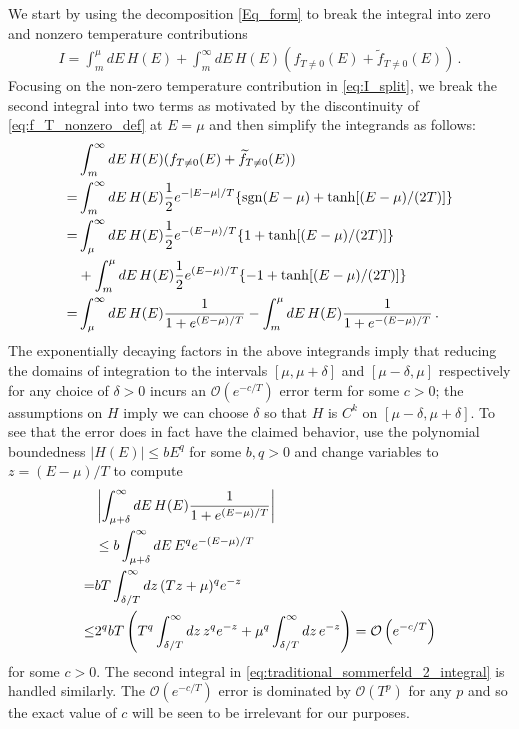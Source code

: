 \documentclass[sn-mathphys,Numbered]{sn-jnl}
\begin{document}
We start by using the decomposition \eqref{Eq_form}  to break the integral into zero and nonzero temperature contributions
\begin{align}\label{eq:I_split}
   I= \int_m^\mu dE\, H(E) +\int_m^\infty dE\, H(E) (f_{T\neq 0}(E)+\widetilde{f}_{T\neq 0}(E))\,.
\end{align}
Focusing on the non-zero temperature contribution in \eqref{eq:I_split},  we break the second integral into two terms as motivated by the discontinuity of \eqref{eq:f_T_nonzero_def} at $E=\mu$ and then simplify the integrands as follows:
\begin{align}
   &\int_m^\infty dE\,H(E) (f_{T\neq 0}(E)+\widetilde{f}_{T\neq 0}(E))\\
    =  &\int_m^\infty dE\, H(E) \frac{1}{2}e^{-|E-\mu|/T}\{\mathrm{sgn}(E-\mu)+\tanh[(E-\mu)/(2T)]\}\notag\\
=&\int_\mu^\infty dE\, H(E) \frac{1}{2}e^{-(E-\mu)/T}\{1+\tanh[(E-\mu)/(2T)]\}\notag\\
&+\int_m^\mu dE\,H(E) \frac{1}{2}e^{(E-\mu)/T}\{-1+\tanh[(E-\mu)/(2T)]\}\notag\\
=&\int_\mu^\infty dE\, H(E)  \frac{1}{1+e^{(E-\mu)/T}}-\int_m^\mu dE\,H(E) \frac{1}{1+e^{-(E-\mu)/T}}\,.\label{eq:traditional_sommerfeld_2_integral}
\end{align}
The exponentially decaying factors in the above integrands imply that  reducing the domains of integration to the intervals $[\mu,\mu+\delta]$ and $[\mu-\delta,\mu]$ respectively for any choice of $\delta>0$ incurs an   $\mathcal{O}(e^{-c/T})$ error term for some $c>0$; the assumptions on $H$ imply we can choose $\delta$ so that $H$ is $C^k$ on $[\mu-\delta,\mu+\delta]$.  To see that the error does in fact have the claimed behavior, use the polynomial boundedness $|H(E)|\leq bE^q$ for some $b,q>0$ and change variables to $z=(E-\mu)/T$ to compute
\begin{align}\label{eq:change_limits_int_exponential_decay}
    &\left|\int_{\mu+\delta}^\infty dE\, H(E)\frac{1}{1+e^{(E-\mu)/T}}\right|\\
    &\leq b\int_{\mu+\delta}^\infty dE\,E^q e^{-(E-\mu)/T}\notag\\
    =& bT\int_{\delta/T}^\infty dz\,(Tz+\mu)^q e^{-z}\notag\\
    \leq &2^qbT\left(T^q \int_{\delta/T}^\infty dz\,z^q e^{-z}+\mu^q \int_{\delta/T}^\infty dz\,e^{-z}\right) =\mathcal{O}\left(e^{-c/T}\right)\notag
\end{align}
for some $c>0$. The second integral in \eqref{eq:traditional_sommerfeld_2_integral} is handled similarly.   The $\mathcal{O}(e^{-c/T})$ error is dominated by  $\mathcal{O}(T^{p})$ for any $p$ and so the exact value of $c$ will be seen to be irrelevant for our purposes.
\end{document}
